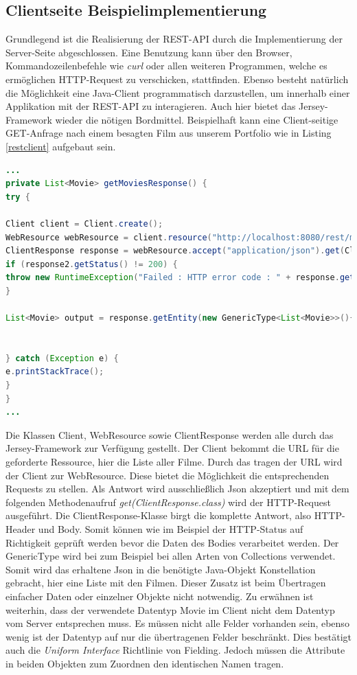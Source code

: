 \documentclass[fleqn,10.5pt,ngerman]{SelfArx}
\begin{document}
\subsection{Clientseite Beispielimplementierung}
Grundlegend ist die Realisierung der REST-API durch die Implementierung der Server-Seite abgeschlossen. Eine Benutzung kann über den Browser, Kommandozeilenbefehle wie \textit{curl} oder allen weiteren Programmen, welche es ermöglichen HTTP-Request zu verschicken, stattfinden. Ebenso besteht natürlich die Möglichkeit eine Java-Client programmatisch darzustellen, um innerhalb einer Applikation mit der REST-API zu interagieren. Auch hier bietet das Jersey-Framework wieder die nötigen Bordmittel. Beispielhaft kann eine Client-seitige GET-Anfrage nach einem besagten Film aus unserem Portfolio wie in Listing \ref{restclient} aufgebaut sein.
\begin{lstlisting}[caption=Beispiel: Beispielhafte Java-Client Anfrage, label=restclient, language=java, emptylines=0, flexiblecolumns=false]
...
private List<Movie> getMoviesResponse() {
try {

Client client = Client.create();
WebResource webResource = client.resource("http://localhost:8080/rest/movies");
ClientResponse response = webResource.accept("application/json").get(ClientResponse.class);
if (response2.getStatus() != 200) {
throw new RuntimeException("Failed : HTTP error code : " + response.getStatus());
}

List<Movie> output = response.getEntity(new GenericType<List<Movie>>(){});


} catch (Exception e) {
e.printStackTrace();
}
}
...
\end{lstlisting}
Die Klassen Client, WebResource sowie ClientResponse werden alle durch das Jersey-Framework zur Verfügung gestellt. Der Client bekommt die URL für die geforderte Ressource, hier die Liste aller Filme. Durch das tragen der URL wird der Client zur WebResource. Diese bietet die Möglichkeit die entsprechenden Requests zu stellen. Als Antwort wird ausschließlich Json akzeptiert und mit dem folgenden Methodenaufruf \textit{get(ClientResponse.class)} wird der HTTP-Request ausgeführt. Die ClientResponse-Klasse birgt die komplette Antwort, also HTTP-Header und Body. Somit können wie im Beispiel der HTTP-Status auf Richtigkeit geprüft werden bevor die Daten des Bodies verarbeitet werden. Der GenericType wird bei zum Beispiel bei allen Arten von Collections verwendet. Somit wird das erhaltene Json in die benötigte Java-Objekt Konstellation gebracht, hier eine Liste mit den Filmen. Dieser Zusatz ist beim Übertragen einfacher Daten oder einzelner Objekte nicht notwendig. Zu erwähnen ist weiterhin, dass der verwendete Datentyp Movie im Client nicht dem Datentyp vom Server entsprechen muss. Es müssen nicht alle Felder vorhanden sein, ebenso wenig ist der Datentyp auf nur die übertragenen Felder beschränkt. Dies bestätigt auch die \textit{Uniform Interface} Richtlinie von Fielding. Jedoch müssen die Attribute in beiden Objekten zum Zuordnen den identischen Namen tragen.
\end{document}
